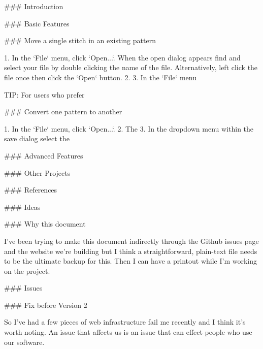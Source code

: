 ### Introduction

### Basic Features

### Move a single stitch in an existing pattern

1. In the `File` menu, click `Open...`. When the open dialog appears find and select your file by double clicking the name of the file. Alternatively, left click the file once then click the `Open` button.
2. 
3. In the `File` menu

TIP: For users who prefer

### Convert one pattern to another

1. In the `File` menu, click `Open...`.
2.  The
3.  In the dropdown menu within the save dialog select the

### Advanced Features

### Other Projects

### References

### Ideas

### Why this document

I've been trying to make this document indirectly through the Github
issues page and the website we're building but I think a
straightforward, plain-text file needs to be the ultimate backup for
this. Then I can have a printout while I'm working on the project.

### Issues

### Fix before Version 2

So I've had a few pieces of web infrastructure fail me recently and I
think it's worth noting. An issue that affects us is an issue that can
effect people who use our software.

